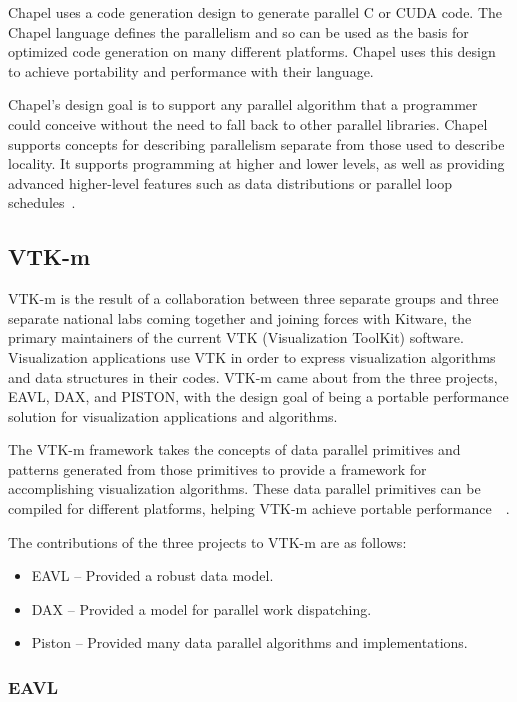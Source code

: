 Chapel uses a code generation design to generate parallel C or CUDA code.
%
The Chapel language defines the parallelism and so can be used as the basis for optimized code generation on many different platforms.
%
Chapel uses this design to achieve portability and performance with their language.

Chapel's design goal is to support any parallel algorithm that a programmer could conceive without the need to fall back to other parallel libraries.
%
Chapel supports concepts for describing parallelism separate from those used to describe locality.
%
It supports programming at higher and lower levels, as well as providing advanced higher-level features such as data distributions or parallel loop schedules~\cite{bradchamberlain2013}.


\subsection*{\textbf{VTK-m}}

VTK-m is the result of a collaboration between three separate groups and three separate national labs coming together and joining forces with Kitware, the primary maintainers of the current VTK (Visualization ToolKit) software.
%
Visualization applications use VTK in order to express visualization algorithms and data structures in their codes.
%
VTK-m came about from the three projects, EAVL, DAX, and PISTON, with the design goal of being a portable performance solution for visualization applications and algorithms.
%

The VTK-m framework takes the concepts of data parallel primitives and patterns generated from those primitives to provide a framework for accomplishing visualization algorithms.
%
These data parallel primitives can be compiled for different platforms, helping VTK-m achieve portable performance~\cite{Moreland:CGA2016}~\cite{JSFI77}.

The contributions of the three projects to VTK-m are as follows:
\begin{itemize}
\item EAVL -- Provided a robust data model. 
\item DAX -- Provided a model for parallel work dispatching. 
\item Piston -- Provided many data parallel algorithms and implementations.
\end{itemize}


\subsubsection*{\textbf{EAVL}}

